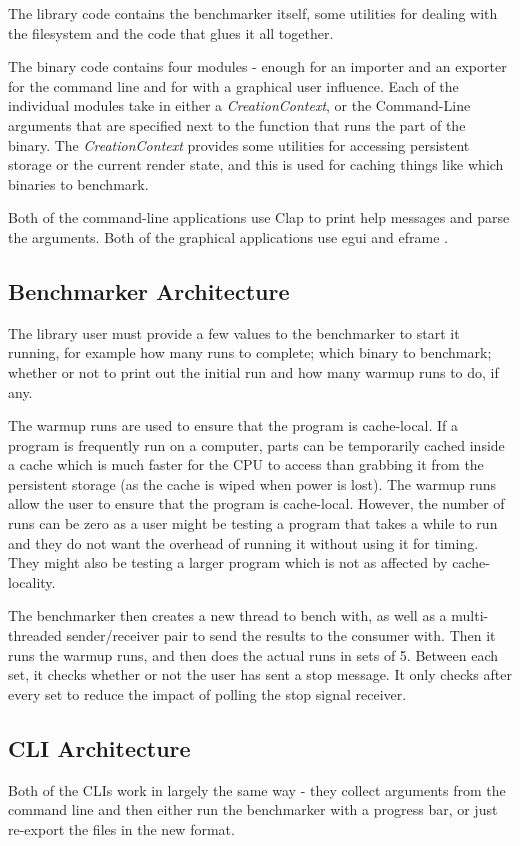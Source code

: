 \documentclass{article}
\begin{document}
\begin{multicols*}{2}
The library code contains the benchmarker itself, some utilities for dealing with the filesystem and the code that glues it all together.

The binary code contains four modules - enough for an importer and an exporter for the command line and for with a graphical user influence. Each of the individual modules take in either a \textit{CreationContext}, or the Command-Line arguments that are specified next to the function that runs the part of the binary. The \textit{CreationContext} provides some utilities for accessing persistent storage or the current render state, and this is used for caching things like which binaries to benchmark.

Both of the command-line applications use Clap \autocite{knappClap2023} to print help messages and parse the arguments. Both of the graphical applications use egui and eframe \autocite{EmilkEguiEgui}.

\subsection{Benchmarker Architecture}
The library user must provide a few values to the benchmarker to start it running, for example how many runs to complete; which binary to benchmark; whether or not to print out the initial run and how many warmup runs to do, if any.

The warmup runs are used to ensure that the program is cache-local. If a program is frequently run on a computer, parts can be temporarily cached inside a cache which is much faster for the CPU to access than grabbing it from the persistent storage (as the cache is wiped when power is lost). The warmup runs allow the user to ensure that the program is cache-local. However, the number of runs can be zero as a user might be testing a program that takes a while to run and they do not want the overhead of running it without using it for timing. They might also be testing a larger program which is not as affected by cache-locality.

The benchmarker then creates a new thread to bench with, as well as a multi-threaded sender/receiver pair to send the results to the consumer with. Then it runs the warmup runs, and then does the actual runs in sets of 5. Between each set, it checks whether or not the user has sent a stop message. It only checks after every set to reduce the impact of polling the stop signal receiver.

\subsection{CLI Architecture}
Both of the CLIs work in largely the same way - they collect arguments from the command line and then either run the benchmarker with a progress bar, or just re-export the files in the new format.


\end{multicols*}
\end{document}
